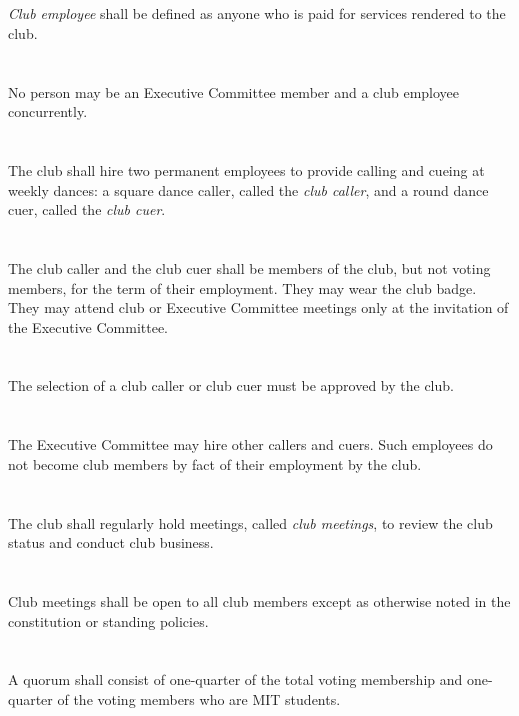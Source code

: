 \documentclass{bylaws}
\begin{document}
\section{}\textit{Club employee} shall be defined as anyone who is paid for services rendered to the club.
\section{}No person may be an Executive Committee member and a club employee concurrently.
\section{}The club shall hire two permanent employees to provide calling and cueing at weekly dances: a square dance caller, called the \textit{club caller}, and a round dance cuer, called the \textit{club cuer}.
\section{}The club caller and the club cuer shall be members of the club, but not voting members, for the term of their employment.  They may wear the club badge.  They may attend club or Executive Committee meetings only at the invitation of the Executive Committee.
\section{}The selection of a club caller or club cuer must be approved by the club.
\section{}The Executive Committee may hire other callers and cuers.  Such employees do not become club members by fact of their employment by the club.


\section{}The club shall regularly hold meetings, called \textit{club meetings}, to review the club status and conduct club business.
\section{}Club meetings shall be open to all club members except as otherwise noted in the constitution or standing policies.
\section{}A quorum shall consist of one-quarter of the total voting membership and one-quarter of the voting members who are MIT students.
\end{document}

